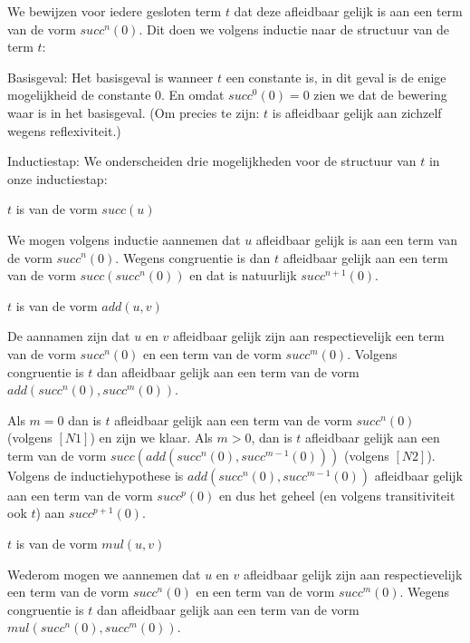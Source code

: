 \documentclass[a4paper,11pt]{article}
\begin{document}
We bewijzen voor iedere gesloten term $t$ dat deze afleidbaar gelijk is aan
een term van de vorm $succ^{n}(0)$. Dit doen we volgens inductie naar de
structuur van de term $t$:

\begin{description}

\item{Basisgeval:}
  Het basisgeval is wanneer $t$ een constante is, in dit geval is de enige
  mogelijkheid de constante $0$. En omdat $succ^0(0) = 0$ zien we dat de
  bewering waar is in het basisgeval. (Om precies te zijn: $t$ is afleidbaar
  gelijk aan zichzelf wegens reflexiviteit.)

\item{Inductiestap:}
  We onderscheiden drie mogelijkheden voor de structuur van $t$ in onze
  inductiestap:

  \begin{description}

  \item{$t$ is van de vorm $succ(u)$}

    We mogen volgens inductie aannemen dat $u$ afleidbaar gelijk is aan een
    term van de vorm $succ^{n}(0)$. Wegens congruentie is dan $t$ afleidbaar
    gelijk aan een term van de vorm $succ(succ^{n}(0))$ en dat is natuurlijk
    $succ^{n+1}(0)$.

  \item{$t$ is van de vorm $add(u, v)$}

    De aannamen zijn dat $u$ en $v$ afleidbaar gelijk zijn aan respectievelijk
    een term van de vorm $succ^{n}(0)$ en een term van de vorm
    $succ^{m}(0)$. Volgens congruentie is $t$ dan afleidbaar gelijk aan een
    term van de vorm $add(succ^{n}(0), succ^{m}(0))$.

    Als $m=0$ dan is $t$ afleidbaar gelijk aan een term van de vorm
    $succ^{n}(0)$ (volgens $[N1]$) en zijn we klaar. Als $m>0$, dan is $t$
    afleidbaar gelijk aan een term van de vorm $succ(add(succ^{n}(0),
    succ^{m-1}(0)))$ (volgens $[N2]$). Volgens de inductiehypothese is
    $add(succ^{n}(0), succ^{m-1}(0))$ afleidbaar gelijk aan een term van de
    vorm $succ^{p}(0)$ en dus het geheel (en volgens transitiviteit ook $t$)
    aan $succ^{p+1}(0)$.

  \item{$t$ is van de vorm $mul(u, v)$}

    Wederom mogen we aannemen dat $u$ en $v$ afleidbaar gelijk zijn aan
    respectievelijk een term van de vorm $succ^{n}(0)$ en een term van de vorm
    $succ^{m}(0)$. Wegens congruentie is $t$ dan afleidbaar gelijk aan een
    term van de vorm $mul(succ^{n}(0), succ^{m}(0))$.


\end{description}
\end{description}
\end{document}
